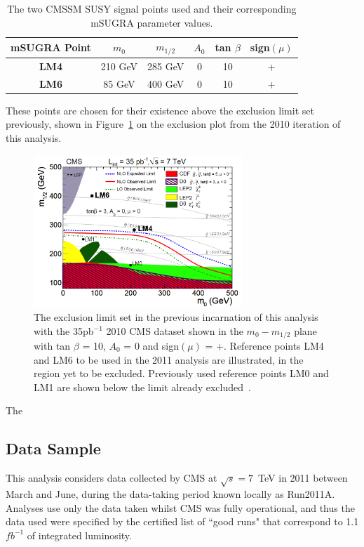 \begin{table}[htbp]
\centering
\begin{tabular}{c c c c c c }
\hline
\hline
\textbf{mSUGRA Point} & $m_{0}$ & $m_{1/2}$ & $A_{0}$ & tan $\beta$ & sign$(\mu) $  \\
\hline
\hline
\textbf{LM4} & 210 GeV & 285 GeV  & 0 & 10 & + \\
\textbf{LM6} & 85 GeV & 400 GeV & 0 & 10 & +\\
\hline
\end{tabular}
\caption{\label{tab:LM}The two CMSSM SUSY signal points used and their corresponding mSUGRA parameter values.}
\end{table}

These points are chosen for their existence above the exclusion limit set previously, shown in Figure~\ref{fig:lm35limit} on the exclusion plot from the 2010 iteration of this analysis\cite{35paper}.

\begin{figure}[htbp]
\centering
\includegraphics[width=0.70\textwidth]{Figures/Analysis/LM46on35limit}
\caption{\label{fig:lm35limit}The exclusion limit set in the previous incarnation of this analysis with the 35pb$^{-1}$ 2010 CMS dataset shown in the $m_{0}-m_{1/2}$ plane with tan $\beta$ = 10, $A_{0}$ = 0 and sign$(\mu)$ = +. Reference points LM4 and LM6 to be used in the 2011 analysis are illustrated, in the region yet to be excluded. Previously used reference points LM0 and LM1 are shown below the limit already excluded~\cite{35paper}.}
\end{figure}

The 
\subsection{Data Sample}
This analysis considers data collected by CMS at $\sqrt{s} = 7$~TeV in 2011 between March and June, during the data-taking period known locally as Run2011A. Analyses use only the data taken whilst CMS was fully operational, and thus the data used were specified by the certified list of ``good runs" that correspond to 1.1$fb^{-1}$ of integrated luminosity. 

